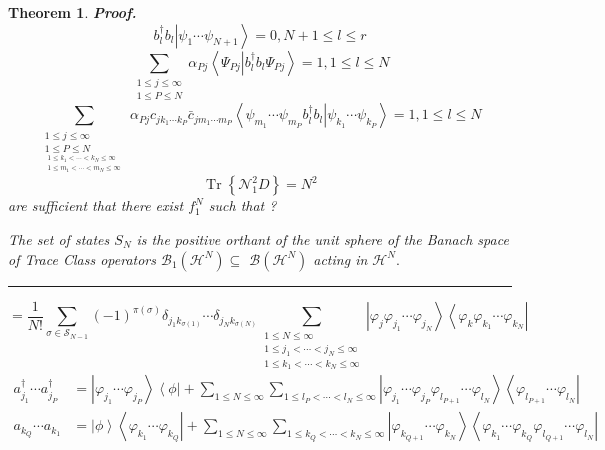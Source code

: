 \documentclass[aps,preprint]{revtex4}%
\newtheorem{theorem}{Theorem}
\newenvironment{proof}[1][Proof]{\noindent\textbf{#1.} }{\ \rule{0.5em}{0.5em}}
\begin{document}
\begin{theorem}
\begin{proof}
\begin{equation}
b_{l}^{\dagger}b_{l}\left\vert \psi_{1}\cdots\psi_{N+1}\right\rangle
=0,N+1\leq l\leq r
\end{equation}%
\begin{equation}
\sum_{\substack{1\leq j\leq\infty\\1\leq P\leq N}}\alpha_{Pj}\left\langle
\Psi_{Pj}\left\vert b_{l}^{\dagger}b_{l}\right.  \Psi_{Pj}\right\rangle
=1,1\leq l\leq N
\end{equation}%
\begin{equation}
\sum_{\substack{1\leq j\leq\infty\\1\leq P\leq N\\_{\substack{1\leq
k_{1}<\cdots<k_{N}\leq\infty\\1\leq m_{1}<\cdots<m_{N}\leq\infty}}}%
}\alpha_{Pj}c_{jk_{1}\cdots k_{P}}\bar{c}_{jm_{1}\cdots m_{P}}\left\langle
\psi_{m_{1}}\cdots\psi_{m_{P}}b_{l}^{\dagger}b_{l}\left\vert \psi_{k_{1}%
}\cdots\psi_{k_{P}}\right.  \right\rangle =1,1\leq l\leq N
\end{equation}%
\begin{equation}
\operatorname*{Tr}\left\{  \mathcal{N}_{1}^{2}D\right\}  =N^{2}%
\end{equation}
are sufficient that there exist $f_{1}^{N}$ such that ?

The set of states $S_{N}$ is the positive orthant of the unit sphere of the
Banach space of Trace Class operators $\mathcal{B}_{1}\left(  \mathcal{H}%
^{N}\right)  \subseteq$ $\mathcal{B}\left(  \mathcal{H}^{N}\right)  $ acting
in $\mathcal{H}^{N}.$
\end{proof}
\end{theorem}

%

\begin{equation}
=\frac{1}{N!}\sum_{\sigma\in\mathcal{S}_{N-1}}\left(  -1\right)  ^{\pi\left(
\sigma\right)  }\delta_{j_{1}k_{\sigma\left(  1\right)  }}\cdots\delta
_{j_{N}k_{\sigma\left(  N\right)  }}\sum_{\substack{1\leq N\leq\infty\\1\leq
j_{1}<\cdots<j_{N}\leq\infty\\1\leq k_{1}<\cdots<k_{N}\leq\infty}}\left\vert
\varphi_{j}\varphi_{j_{1}}\cdots\varphi_{j_{N}}\right\rangle \left\langle
\varphi_{k}\varphi_{k_{1}}\cdots\varphi_{k_{N}}\right\vert
\end{equation}%
\begin{align}
a_{j_{1}}^{\dagger}\cdots a_{j_{P}}^{\dagger}  &  =\left\vert \varphi_{j_{1}%
}\cdots\varphi_{j_{P}}\right\rangle \left\langle \phi\right\vert +\sum_{1\leq
N\leq\infty}\sum_{1\leq l_{P}<\cdots<l_{N}\leq\infty}\left\vert \varphi
_{j_{1}}\cdots\varphi_{j_{P}}\varphi_{l_{P+1}}\cdots\varphi_{l_{N}%
}\right\rangle \left\langle \varphi_{l_{P+1}}\cdots\varphi_{l_{N}}\right\vert
\nonumber\\
a_{k_{Q}}\cdots a_{k_{1}}  &  =\left\vert \phi\right\rangle \left\langle
\varphi_{k_{1}}\cdots\varphi_{k_{Q}}\right\vert +\sum_{1\leq N\leq\infty}%
\sum_{1\leq k_{Q}<\cdots<k_{N}\leq\infty}\left\vert \varphi_{k_{Q+1}}%
\cdots\varphi_{k_{N}}\right\rangle \left\langle \varphi_{k_{1}}\cdots
\varphi_{k_{Q}}\varphi_{l_{Q+1}}\cdots\varphi_{l_{N}}\right\vert
\end{align}
\end{document}

